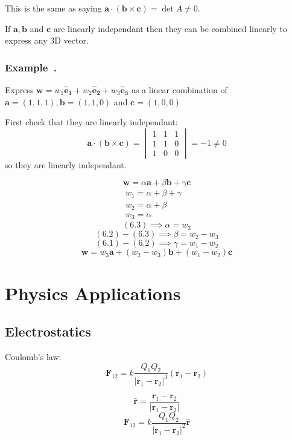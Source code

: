 \documentclass{article}
\newcommand{\vh}[1]{\vec{\hat{#1}}}
\renewcommand{\vec}[1]{\bm{#1}}
\newcommand{\vv}[1]{\vec{#1}}
\newcommand{\ve}[1]{\vec{\hat{e}_{#1}}}
\newcounter{example}[section]
\newenvironment{example}[1][]{\refstepcounter{example}\vspace{-0.2cm}
\subsubsection*{Example~\thesection.\theexample} \rmfamily}{\par}
\begin{document}
This is the same as saying \(\vv a\cdot(\vv b\times\vv c)=\det A\ne0\).

If \(\vv a,\vv b\) and \(\vv c\) are linearly independant then they can be combined linearly to express any 3D vector.

\begin{example}
Express \(\vv w=w_1\ve1+w_2\ve2+w_3\ve3\) as a linear combination of \(\vv a=(1,1,1),\vv b=(1,1,0)\) and \(\vv c=(1,0,0)\)

First check that they are linearly independant:
\[\vv a\cdot(\vv b\times\vv c)=
\begin{vmatrix}
1 & 1 & 1\\
1 & 1 & 0\\
1 & 0 & 0
\end{vmatrix}
=-1\ne0\]
so they are linearly independant.

\[\vv w=\alpha\vv a+\beta\vv b+\gamma\vv c\]
\begin{align*}
w_1=\alpha + \beta +\gamma\tag{6.1}\\
w_2=\alpha + \beta \tag{6.2}\\
w_3=\alpha\qquad&\tag{6.3}
\end{align*}
\[(6.3)\implies\alpha=w_3\]
\[(6.2)-(6.3)\implies\beta=w_2-w_3\]
\[(6.1)-(6.2)\implies\gamma=w_1-w_2\]
\[\vv w=w_3\vv a+(w_2-w_3)\vv b+(w_1-w_2)\vv c\]
\end{example}
\section{Physics Applications}

\subsection*{Electrostatics}

Coulomb's law:
\[\vv F_{12}=k\frac{Q_1Q_2}{|\vv r_1-\vv r_2|^3}(\vv r_1-\vv r_2)\]

\begin{center}
\end{center}
\[\vh r=\frac{\vv r_1-\vv r_2}{|\vv r_1-\vv r_2|}\]
\[\vv F_{12}=k\frac{Q_1Q_2}{|\vv r_1-\vv r_2|^2}\vh r\]
\end{document}
